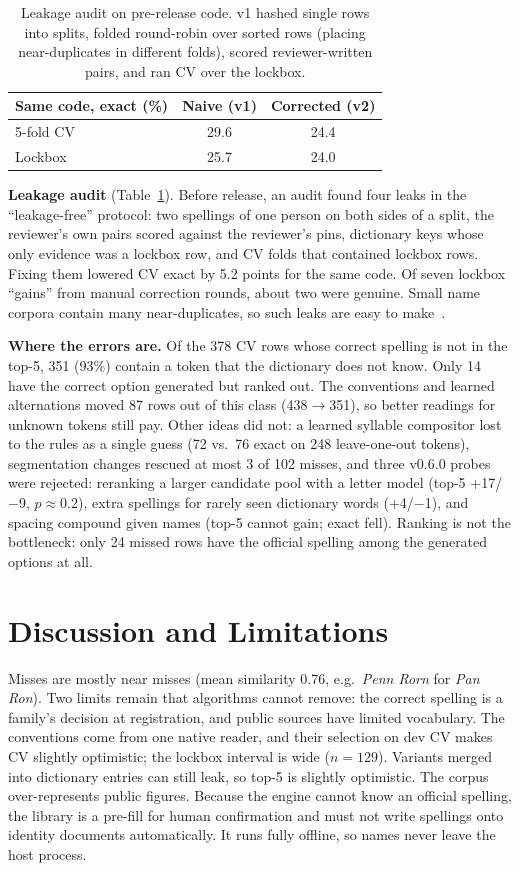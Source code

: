 \documentclass[10pt,twocolumn,a4paper]{article}
\begin{document}
\begin{table}[t]
\centering\small
\begin{tabular}{@{}lcc@{}}
\toprule
Same code, exact (\%) & Naive (v1) & Corrected (v2) \\
\midrule
5-fold CV & 29.6 & 24.4 \\
Lockbox & 25.7 & 24.0 \\
\bottomrule
\end{tabular}
\caption{Leakage audit on pre-release code. v1 hashed single rows into
splits, folded round-robin over sorted rows (placing near-duplicates in
different folds), scored reviewer-written pairs, and ran CV over the
lockbox.}
\label{tab:audit}
\end{table}

\textbf{Leakage audit} (Table~\ref{tab:audit}). Before release, an audit
found four leaks in the ``leakage-free'' protocol: two spellings of one
person on both sides of a split, the reviewer's own pairs scored against
the reviewer's pins, dictionary keys whose only evidence was a lockbox
row, and CV folds that contained lockbox rows. Fixing them lowered CV
exact by 5.2 points for the same code. Of seven lockbox ``gains'' from
manual correction rounds, about two were genuine. Small name corpora
contain many near-duplicates, so such leaks are easy to
make~\cite{kapoor2023leakage}.

\textbf{Where the errors are.} Of the 378 CV rows whose correct spelling
is not in the top-5, 351 (93\%) contain a token that the dictionary does
not know. Only 14 have the correct option generated but ranked out. The
conventions and learned alternations moved 87 rows out of this class
(438$\to$351), so better readings for unknown tokens still pay. Other
ideas did not: a learned syllable compositor lost to the rules as a
single guess (72 vs.\ 76 exact on 248 leave-one-out tokens),
segmentation changes rescued at most 3 of 102 misses, and three v0.6.0
probes were rejected: reranking a larger candidate pool with a letter
model (top-5 +17/$-$9, $p{\approx}0.2$), extra spellings for rarely seen
dictionary words (+4/$-$1), and spacing compound given names (top-5
cannot gain; exact fell). Ranking is not the bottleneck: only 24 missed
rows have the official spelling among the generated options at all.

\section{Discussion and Limitations}
Misses are mostly near misses (mean similarity 0.76, e.g.\ \emph{Penn Rorn}
for \emph{Pan Ron}). Two limits remain that algorithms cannot remove:
the correct spelling is a family's decision at registration, and public
sources have limited vocabulary. The conventions come from one native
reader, and their selection on dev CV makes CV slightly optimistic; the
lockbox interval is wide ($n{=}129$). Variants merged into dictionary
entries can still leak, so top-5 is slightly optimistic. The corpus
over-represents public figures. Because the engine cannot know an
official spelling, the library is a pre-fill for human confirmation and
must not write spellings onto identity documents automatically. It runs
fully offline, so names never leave the host process.
\end{document}
